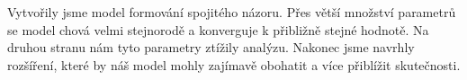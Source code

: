 \documentclass[10pt,a4paper]{report}
\begin{document}
Vytvořily jsme model formování spojitého názoru. Přes větší množství parametrů se model chová velmi stejnorodě a konverguje k přibližně stejné hodnotě. Na druhou stranu nám tyto parametry ztížily analýzu. Nakonec jsme navrhly rozšíření, které by náš model mohly zajímavě obohatit a více přiblížit skutečnosti.





\end{document}
